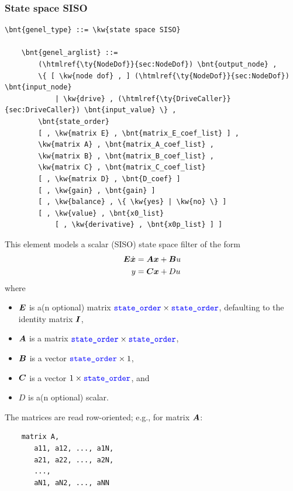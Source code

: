 \subsubsection{State space SISO}
\label{sec:EL:GENEL:STATE-SPACE-SISO}
\begin{Verbatim}[commandchars=\\\{\}]
    \bnt{genel_type} ::= \kw{state space SISO}

    \bnt{genel_arglist} ::=
        (\htmlref{\ty{NodeDof}}{sec:NodeDof}) \bnt{output_node} ,
        \{ [ \kw{node dof} , ] (\htmlref{\ty{NodeDof}}{sec:NodeDof}) \bnt{input_node}
            | \kw{drive} , (\htmlref{\ty{DriveCaller}}{sec:DriveCaller}) \bnt{input_value} \} ,
        \bnt{state_order}
        [ , \kw{matrix E} , \bnt{matrix_E_coef_list} ] ,
        \kw{matrix A} , \bnt{matrix_A_coef_list} ,
        \kw{matrix B} , \bnt{matrix_B_coef_list} ,
        \kw{matrix C} , \bnt{matrix_C_coef_list}
        [ , \kw{matrix D} , \bnt{D_coef} ]
        [ , \kw{gain} , \bnt{gain} ]
        [ , \kw{balance} , \{ \kw{yes} | \kw{no} \} ]
        [ , \kw{value} , \bnt{x0_list}
            [ , \kw{derivative} , \bnt{x0p_list} ] ]
\end{Verbatim}
This element models a scalar (SISO) state space filter of the form
\begin{align*}
	\boldsymbol{E} \dot{\boldsymbol{x}} &= \boldsymbol{A} \boldsymbol{x} + \boldsymbol{B} u \\
	y &= \boldsymbol{C} \boldsymbol{x} + D u
\end{align*}
where
\begin{itemize}
\item $\boldsymbol{E}$ is a(n optional) matrix
	$\textcolor{blue}{\texttt{state\_order}} \times \textcolor{blue}{\texttt{state\_order}}$, defaulting to the identity matrix $\boldsymbol{I}$,
\item $\boldsymbol{A}$ is a matrix
	$\textcolor{blue}{\texttt{state\_order}} \times \textcolor{blue}{\texttt{state\_order}}$,
\item $\boldsymbol{B}$ is a vector
	$\textcolor{blue}{\texttt{state\_order}} \times 1$,
\item $\boldsymbol{C}$ is a vector
	$1 \times \textcolor{blue}{\texttt{state\_order}}$, and
\item $D$ is a(n optional) scalar.
\end{itemize}
The matrices are read row-oriented; e.g., for matrix $\boldsymbol{A}$:
\begin{verbatim}
    matrix A,
       a11, a12, ..., a1N,
       a21, a22, ..., a2N,
       ...,
       aN1, aN2, ..., aNN
\end{verbatim}

